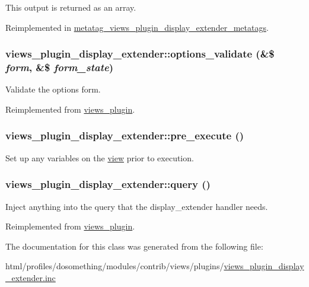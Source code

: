 This output is returned as an array. 

Reimplemented in \hyperlink{classmetatag__views__plugin__display__extender__metatags_a576b24d90f7f9d21a9409670afc10a6f}{metatag\_\-views\_\-plugin\_\-display\_\-extender\_\-metatags}.\hypertarget{classviews__plugin__display__extender_a0a0fe3d8d71d295e99a72c371160515c}{
\subsubsection[{options\_\-validate}]{\setlength{\rightskip}{0pt plus 5cm}views\_\-plugin\_\-display\_\-extender::options\_\-validate (\&\$ {\em form}, \/  \&\$ {\em form\_\-state})}}
\label{classviews__plugin__display__extender_a0a0fe3d8d71d295e99a72c371160515c}
Validate the options form. 

Reimplemented from \hyperlink{classviews__plugin_a46d72eb35feea36fed83cd1355a47431}{views\_\-plugin}.\hypertarget{classviews__plugin__display__extender_a0de1a2dce78f95867b56801d2659e35b}{
\subsubsection[{pre\_\-execute}]{\setlength{\rightskip}{0pt plus 5cm}views\_\-plugin\_\-display\_\-extender::pre\_\-execute ()}}
\label{classviews__plugin__display__extender_a0de1a2dce78f95867b56801d2659e35b}
Set up any variables on the \hyperlink{classview}{view} prior to execution. \hypertarget{classviews__plugin__display__extender_ac8eef76f1f05ac916f9549d5d94164b8}{
\subsubsection[{query}]{\setlength{\rightskip}{0pt plus 5cm}views\_\-plugin\_\-display\_\-extender::query ()}}
\label{classviews__plugin__display__extender_ac8eef76f1f05ac916f9549d5d94164b8}
Inject anything into the query that the display\_\-extender handler needs. 

Reimplemented from \hyperlink{classviews__plugin_a10ac07c47c4a8735786f9fcc38548587}{views\_\-plugin}.

The documentation for this class was generated from the following file:\begin{DoxyCompactItemize}
\item 
html/profiles/dosomething/modules/contrib/views/plugins/\hyperlink{views__plugin__display__extender_8inc}{views\_\-plugin\_\-display\_\-extender.inc}\end{DoxyCompactItemize}
